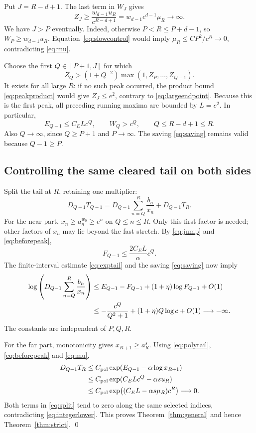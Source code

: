 \documentclass[11pt]{article}
\numberwithin{equation}{section}
\begin{document}
Put $J=R-d+1$. The last term in $W_J$ gives
\begin{equation}\label{eq:largeendpoint}
  Z_J\ge\frac{w_{d-1}u_R}{c^{R-d+1}}
       =w_{d-1}c^{d-1}\mu_R\longrightarrow\infty.
\end{equation}
We have $J>P$ eventually. Indeed, otherwise $P<R\le P+d-1$, so
$W_P\ge w_{d-1}u_R$. Equation~\eqref{eq:slowcontrol} would imply
$\mu_R\le CP^2/c^R\to0$, contradicting \eqref{eq:mu}.

Choose the first $Q\in[P+1,J]$ for which
\begin{equation}\label{eq:firstpeak}
  Z_Q>(1+Q^{-2})\max(1,Z_P,\ldots,Z_{Q-1}).
\end{equation}
It exists for all large $R$: if no such peak occurred, the product
bound \eqref{eq:peakproduct} would give $Z_J\le e^2$, contrary to
\eqref{eq:largeendpoint}. Because this is the first peak, all preceding
running maxima are bounded by $L=e^2$. In particular,
\begin{equation}\label{eq:beforepeak}
  E_{Q-1}\le C_E L c^Q,\qquad
  W_Q>c^Q,\qquad Q\le R-d+1\le R.
\end{equation}
Also $Q\to\infty$, since $Q\ge P+1$ and $P\to\infty$.
The saving \eqref{eq:saving} remains valid because $Q-1\ge P$.

\subsection{Controlling the same cleared tail on both sides}

Split the tail at $R$, retaining one multiplier:
\begin{equation}\label{eq:split}
  D_{Q-1}T_{Q-1}
   =D_{Q-1}\sum_{n=Q}^{R}\frac{b_n}{x_n}+D_{Q-1}T_R.
\end{equation}
For the near part, $x_n\ge a_n^{w_0}\ge e^n$ on $Q\le n\le R$.
Only this first factor is needed; other factors of $x_n$ may lie
beyond the fast stretch. By \eqref{eq:jump} and \eqref{eq:beforepeak},
\[
  F_{Q-1}\le\frac{2C_E L}{\alpha}c^Q.
\]
The finite-interval estimate \eqref{eq:exptail} and the saving
\eqref{eq:saving} now imply
\begin{align}
  \log\left(D_{Q-1}\sum_{n=Q}^{R}\frac{b_n}{x_n}\right)
  &\le E_{Q-1}-F_{Q-1}+(1+\eta)\log F_{Q-1}+O(1)\notag\\
  &\le-\frac{c^Q}{Q^2+1}+(1+\eta)Q\log c+O(1)
       \longrightarrow-\infty. \label{eq:near}
\end{align}
The constants are independent of $P,Q,R$.

For the far part, monotonicity gives $x_{R+1}\ge a_R^s$.
Using \eqref{eq:polytail}, \eqref{eq:beforepeak} and \eqref{eq:mu},
\begin{align}
  D_{Q-1}T_R
   &\le C_{\mathrm{pol}}\exp(E_{Q-1}-\alpha\log x_{R+1})\notag\\
   &\le C_{\mathrm{pol}}\exp(C_E Lc^Q-\alpha s u_R)\notag\\
   &\le C_{\mathrm{pol}}\exp\bigl((C_E L-\alpha s\mu_R)c^R\bigr)
        \longrightarrow0. \label{eq:far}
\end{align}
Both terms in \eqref{eq:split} tend to zero along the same selected
indices, contradicting \eqref{eq:integerlower}. This proves
Theorem~\ref{thm:general} and hence Theorem~\ref{thm:strict}. \qed
\end{document}

